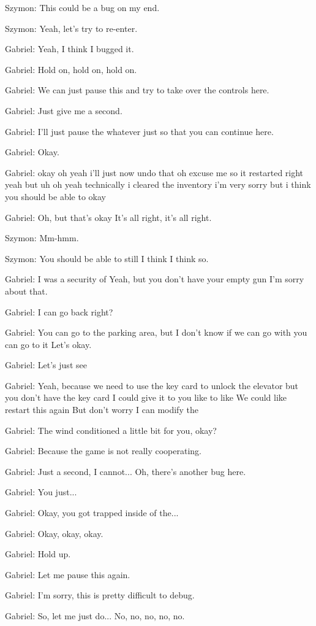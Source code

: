 Szymon: This could be a bug on my end.

Szymon: Yeah, let's try to re-enter.

Gabriel: Yeah, I think I bugged it.

Gabriel: Hold on, hold on, hold on.

Gabriel: We can just pause this and try to take over the controls here.

Gabriel: Just give me a second.

Gabriel: I'll just pause the whatever just so that you can continue here.

Gabriel: Okay.

Gabriel: okay oh yeah i'll just now undo that oh excuse me so it restarted right yeah but uh oh yeah technically i cleared the inventory i'm very sorry but i think you should be able to okay

Gabriel: Oh, but that's okay It's all right, it's all right.

Szymon: Mm-hmm.

Szymon: You should be able to still I think I think so.

Gabriel: I was a security of Yeah, but you don't have your empty gun I'm sorry about that.

Gabriel: I can go back right?

Gabriel: You can go to the parking area, but I don't know if we can go with you can go to it Let's okay.

Gabriel: Let's just see

Gabriel: Yeah, because we need to use the key card to unlock the elevator but you don't have the key card I could give it to you like to like We could like restart this again But don't worry I can modify the

Gabriel: The wind conditioned a little bit for you, okay?

Gabriel: Because the game is not really cooperating.

Gabriel: Just a second, I cannot... Oh, there's another bug here.

Gabriel: You just...

Gabriel: Okay, you got trapped inside of the...

Gabriel: Okay, okay, okay.

Gabriel: Hold up.

Gabriel: Let me pause this again.

Gabriel: I'm sorry, this is pretty difficult to debug.

Gabriel: So, let me just do... No, no, no, no, no.


